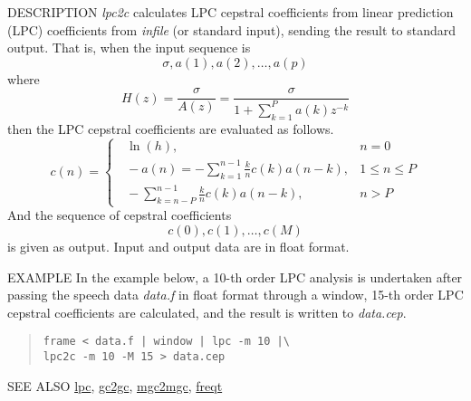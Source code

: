\begin{synopsis}
 \item[lpc2c] [ --m $M_1$ ] [ --M $M_2$ ] [ {\em infile} ]
\end{synopsis}
\begin{qsection}{DESCRIPTION}
{\em lpc2c} calculates LPC cepstral coefficients 
from linear prediction (LPC) coefficients 
from {\em infile} (or standard input), 
sending the result to standard output.
That is, when the input sequence is 
\begin{displaymath} 
   \sigma, a(1), a(2), \dots, a(p) 
\end{displaymath}
where
\begin{displaymath}
   H(z)=\frac{\sigma}{A(z)}=\frac{\sigma}{\displaystyle 1+\sum_{k=1}^P a(k) z^{-k}}
\end{displaymath}
then the LPC cepstral coefficients are evaluated as follows.
\begin{displaymath}
   c(n) = \begin{cases}
 \;\; \ln(h),&n=0\\
 \;\; \displaystyle -a(n)=-\sum^{n-1}_{k=1}\frac{k}{n}c(k) a(n-k),&1\leq n\leq P\\ 
 \;\; \displaystyle -\sum_{k=n-P}^{n-1}\frac{k}{n}c(k) a(n-k),& n>P
\end{cases}
\end{displaymath}
And the sequence of cepstral coefficients
\begin{displaymath}
   c(0), c(1), \dots, c(M)
\end{displaymath}
is given as output.
Input and output data are in float format.
\end{qsection}

\begin{options}
\end{options}

\begin{qsection}{EXAMPLE}
In the example below, a 10-th order LPC analysis is undertaken after
passing the speech data {\em data.f} in float format through a window,
15-th order LPC cepstral coefficients are calculated,
and the result is written to {\em data.cep}.
\begin{quote}
 \verb!frame < data.f | window | lpc -m 10 |\!\\
 \verb!lpc2c -m 10 -M 15 > data.cep!
\end{quote}
\end{qsection}

\begin{qsection}{SEE ALSO}
\hyperlink{lpc}{lpc},
\hyperlink{gc2gc}{gc2gc},
\hyperlink{mgc2mgc}{mgc2mgc},
\hyperlink{freqt}{freqt}
\end{qsection}
